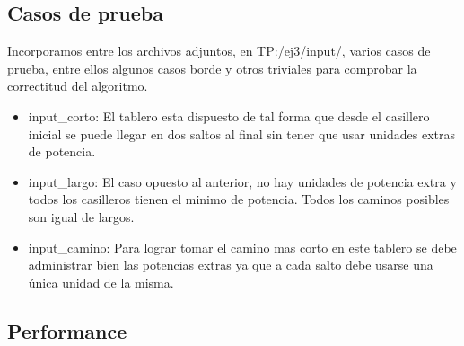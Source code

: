 \newpage
\subsection{Casos de prueba}

Incorporamos entre los archivos adjuntos, en TP:/ej3/input/, varios casos de prueba, entre ellos algunos casos borde y otros triviales para comprobar la correctitud del algoritmo.

\begin{itemize}
\item input\_corto: El tablero esta dispuesto de tal forma que desde el casillero inicial se puede llegar en dos saltos al final sin tener que usar unidades extras de potencia.
\item input\_largo: El caso opuesto al anterior, no hay unidades de potencia extra y todos los casilleros tienen el minimo de potencia. Todos los caminos posibles son igual de largos.
\item input\_camino: Para lograr tomar el camino mas corto en este tablero se debe administrar bien las potencias extras ya que a cada salto debe usarse una \'unica unidad de la misma.
\end{itemize}

\subsection{Performance}
